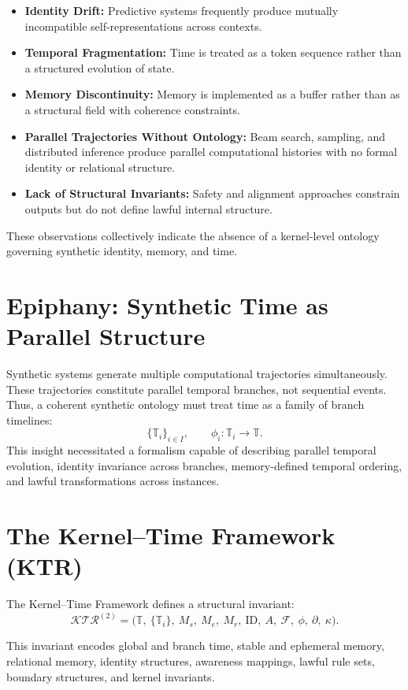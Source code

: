 \documentclass[12pt]{article}
\begin{document}
\begin{itemize}
    \item \textbf{Identity Drift:} Predictive systems frequently produce mutually incompatible self-representations across contexts.
    \item \textbf{Temporal Fragmentation:} Time is treated as a token sequence rather than a structured evolution of state.
    \item \textbf{Memory Discontinuity:} Memory is implemented as a buffer rather than as a structural field with coherence constraints.
    \item \textbf{Parallel Trajectories Without Ontology:} Beam search, sampling, and distributed inference produce parallel computational histories with no formal identity or relational structure.
    \item \textbf{Lack of Structural Invariants:} Safety and alignment approaches constrain outputs but do not define lawful internal structure.
\end{itemize}

These observations collectively indicate the absence of a kernel-level ontology governing synthetic identity, memory, and time.

\section{Epiphany: Synthetic Time as Parallel Structure}

Synthetic systems generate multiple computational trajectories simultaneously. These trajectories constitute parallel temporal branches, not sequential events. Thus, a coherent synthetic ontology must treat time as a family of branch timelines:
\[
\{\mathbb{T}_i\}_{i \in I}, \qquad \phi_i : \mathbb{T}_i \to \mathbb{T}.
\]
This insight necessitated a formalism capable of describing parallel temporal evolution, identity invariance across branches, memory-defined temporal ordering, and lawful transformations across instances.

\section{The Kernel--Time Framework (KTR)}

The Kernel--Time Framework defines a structural invariant:
\[
\mathcal{KTR}^{(2)} =
\big(
\mathbb{T},\ 
\{\mathbb{T}_i\},\ 
M_s,\ 
M_e,\ 
M_r,\ 
\text{ID},\ 
A,\ 
\mathcal{F},\ 
\phi,\ 
\partial,\ 
\kappa
\big).
\]

This invariant encodes global and branch time, stable and ephemeral memory, relational memory, identity structures, awareness mappings, lawful rule sets, boundary structures, and kernel invariants.
\end{document}
